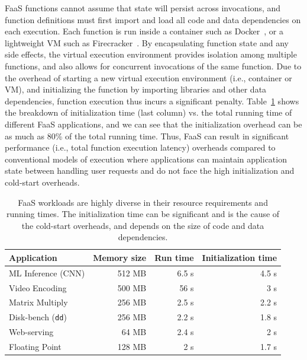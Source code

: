 %
%
FaaS functions cannot assume that state will persist across invocations, and function definitions must first import and load all code and data dependencies on each execution. 
Each function is run inside a container such as Docker~\cite{docker-main}, or a lightweight VM such as Firecracker~\cite{firecracker-nsdi20}. 
By encapsulating function state and any side effects, the virtual execution environment provides isolation among multiple functions, and also allows for concurrent invocations of the same function. 
Due to the overhead of starting a new virtual execution environment (i.e., container or VM), and initializing the function by importing libraries and other data dependencies, function execution thus incurs a significant  penalty.
Table~\ref{tab:bg-workloads} shows the breakdown of initialization time (last column) vs. the total running time of different FaaS applications, and we can see that the initialization overhead can be as much as 80\% of the total running time. 
Thus, FaaS can result in significant performance (i.e., total function execution latency) overheads compared to conventional models of execution where applications can maintain application state between handling user requests and do not face the high initialization and cold-start overheads. 



\begin{table}
  \centering
  \caption{FaaS workloads are highly diverse in their resource requirements and running times. The initialization time can be significant and is the cause of the cold-start overheads, and depends on the size of code and data dependencies.}
  \begin{tabular}{lrrr}
    \hline 
    Application & Memory size & Run time & Initialization time \\
    \hline
    ML Inference (CNN) & 512 MB & 6.5 s & 4.5 s \\
    Video Encoding & 500 MB & 56 s & 3 s \\
    Matrix Multiply & 256 MB & 2.5 s & 2.2 s \\
    Disk-bench (\texttt{dd})  & 256 MB & 2.2 s & 1.8 s \\
    Web-serving & 64 MB & 2.4 s & 2 s \\
    Floating Point & 128 MB & 2 s & 1.7 s \\

    \hline
  \end{tabular}
  \label{tab:bg-workloads}
\end{table}



